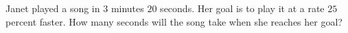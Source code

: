 Janet played a song in $3$ minutes $20$ seconds. Her goal is to play it at a rate $25$ percent faster. How many seconds will the song take when she reaches her goal?
